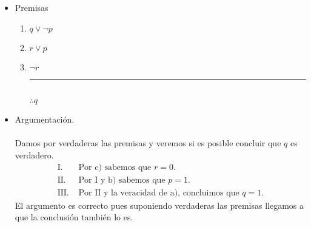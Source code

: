 \documentclass[8pt, letterpaper]{article}
\begin{document}
\begin{enumerate}
\begin{itemize}
  \item Premisas
    \begin{enumerate}
    \item $q\lor \neg p$
    \item $r \lor  p$ 
    \item $\lnot r$\\
      \rule{.07\textwidth}{0.2mm}\\
      $\therefore q$
    \end{enumerate}
    \item Argumentación.\\\\
      Damos por verdaderas las premisas y veremos si es posible concluir que $q$ es verdadero.
      \begin{align*}
        \text{I.}& \text{ Por c) sabemos que } r = 0.\\
        \text{II.}& \text{ Por I y b) sabemos que } p = 1.\\
        \text{III.}& \text{ Por II y la veracidad de a), concluimos que } q = 1.
      \end{align*}
      El argumento es correcto pues suponiendo verdaderas las premisas llegamos a que la conclusión también lo es.
    \end{itemize}
  \end{enumerate}
\end{document}
